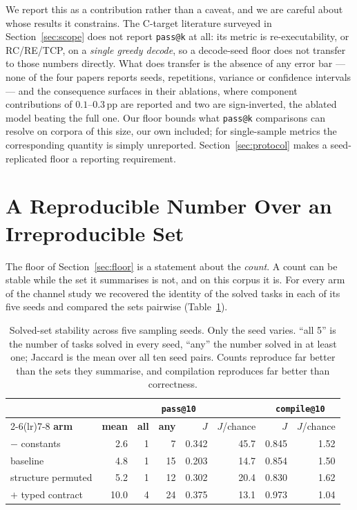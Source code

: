 \documentclass[conference]{IEEEtran}
\makeatletter
\newcommand{\passatk}{\texttt{pass@k}\xspace}
\newcommand{\passat}[1]{\texttt{pass@#1}\xspace}
\newcommand{\compileat}[1]{\texttt{compile@#1}\xspace}
\newcommand{\pp}{\,pp\xspace}
\makeatother
\begin{document}
We report this as a contribution rather than a caveat, and we are careful about
whose results it constrains. The C-target literature surveyed in
Section~\ref{sec:scope} does not report \passatk at all: its metric is
re-executability, or RC/RE/TCP, on a \emph{single greedy decode}, so a decode-seed
floor does not transfer to those numbers directly. What does transfer is the
absence of any error bar --- none of the four papers reports seeds, repetitions,
variance or confidence intervals --- and the consequence surfaces in their
ablations, where component contributions of $0.1$--$0.3$\pp are reported and two
are sign-inverted, the ablated model beating the full one. Our floor bounds what
\passatk comparisons can resolve on corpora of this size, our own included; for
single-sample metrics the corresponding quantity is simply unreported.
Section~\ref{sec:protocol} makes a seed-replicated floor a reporting requirement.

\section{A Reproducible Number Over an Irreproducible Set}
\label{sec:turnover}
The floor of Section~\ref{sec:floor} is a statement about the \emph{count}. A
count can be stable while the set it summarises is not, and on this corpus it is.
For every arm of the channel study we recovered the identity of the solved tasks
in each of its five seeds and compared the sets pairwise
(Table~\ref{tab:turnover}).

\begin{table}[t]
\caption{Solved-set stability across five sampling seeds. Only the seed varies.
``all 5'' is the number of tasks solved in every seed, ``any'' the number solved
in at least one; Jaccard is the mean over all ten seed pairs. Counts reproduce
far better than the sets they summarise, and compilation reproduces far better
than correctness.}
\label{tab:turnover}
\centering
\scriptsize
\setlength{\tabcolsep}{3.5pt}
\begin{tabular}{@{}lrrrrrrr@{}}
\toprule
 & \multicolumn{5}{c}{\passat{10}} & \multicolumn{2}{c}{\compileat{10}} \\
\cmidrule(lr){2-6}\cmidrule(lr){7-8}
\textbf{arm} & \textbf{mean} & \textbf{all} & \textbf{any} & $J$ & $J$/chance & $J$ & $J$/chance\\
\midrule
$-$ constants      & 2.6  & 1 & 7  & 0.342 & 45.7 & 0.845 & 1.52\\
baseline           & 4.8  & 1 & 15 & 0.203 & 14.7 & 0.854 & 1.50\\
structure permuted & 5.2  & 1 & 12 & 0.302 & 20.4 & 0.830 & 1.62\\
$+$ typed contract & 10.0 & 4 & 24 & 0.375 & 13.1 & 0.973 & 1.04\\
\bottomrule
\end{tabular}
\end{table}
\end{document}
